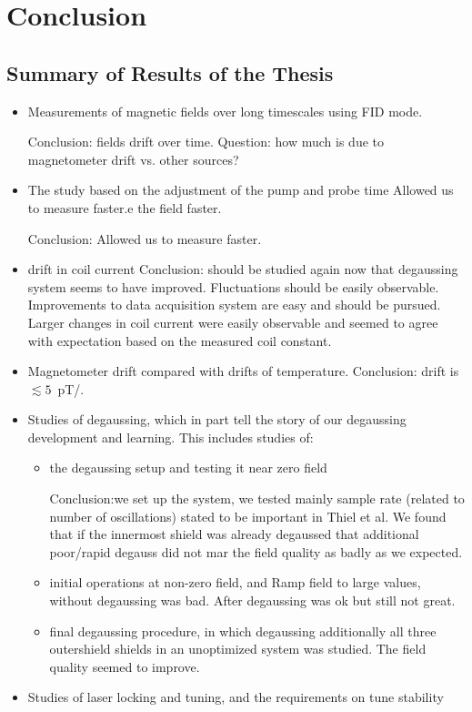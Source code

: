 \chapter{Conclusion\label{ch:conclusion}}
\section{Summary of Results of the Thesis}
\begin{itemize}
\item Measurements of magnetic fields over long timescales using FID mode.

Conclusion: fields drift over time.  Question: how much is due to
 magnetometer drift vs. other sources?

\item The study based on the adjustment of the pump and probe time Allowed us to measure faster.e the field faster.
  
Conclusion: Allowed us to measure faster.
\item drift in coil current Conclusion: should be studied again now
  that degaussing system seems to have improved.  Fluctuations should
  be easily observable.  Improvements to data acquisition system are
  easy and should be pursued.  Larger changes in coil current were
  easily observable and seemed to agree with expectation based on the
  measured coil constant.
\item Magnetometer drift compared with drifts of temperature.
  Conclusion: drift is $\lesssim 5$~pT/.
\item Studies of degaussing, which in part tell the story of our
  degaussing development and learning.  This includes studies of:
  \begin{itemize}
    \item the degaussing setup and testing it near zero field
    
Conclusion:we set up the system, we tested mainly sample rate (related
to number of oscillations) stated to be important in Thiel et
al.\cite{doi:10.1063/1.2713433} We found that if the innermost shield
was already degaussed that additional poor/rapid degauss did not mar
the field quality as badly as we expected.
    \item initial operations at non-zero field, and Ramp field to
      large values, without degaussing was bad.  After degaussing was
      ok but still not great.
    \item final degaussing procedure, in which degaussing additionally
      all three outershield shields in an unoptimized system was
      studied.  The field quality seemed to improve.
  \end{itemize}
\item Studies of laser locking and tuning, and the requirements on
  tune stability
  \end{itemize}
